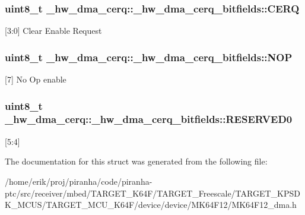 \subsubsection[{\texorpdfstring{C\+E\+RQ}{CERQ}}]{\setlength{\rightskip}{0pt plus 5cm}uint8\+\_\+t \+\_\+hw\+\_\+dma\+\_\+cerq\+::\+\_\+hw\+\_\+dma\+\_\+cerq\+\_\+bitfields\+::\+C\+E\+RQ}\hypertarget{struct__hw__dma__cerq_1_1__hw__dma__cerq__bitfields_a6f0823169a385c91dbbb80a733b55156}{}\label{struct__hw__dma__cerq_1_1__hw__dma__cerq__bitfields_a6f0823169a385c91dbbb80a733b55156}
\mbox{[}3\+:0\mbox{]} Clear Enable Request 
\subsubsection[{\texorpdfstring{N\+OP}{NOP}}]{\setlength{\rightskip}{0pt plus 5cm}uint8\+\_\+t \+\_\+hw\+\_\+dma\+\_\+cerq\+::\+\_\+hw\+\_\+dma\+\_\+cerq\+\_\+bitfields\+::\+N\+OP}\hypertarget{struct__hw__dma__cerq_1_1__hw__dma__cerq__bitfields_a1a3a3088aea9eab35f27b0cc12988d6f}{}\label{struct__hw__dma__cerq_1_1__hw__dma__cerq__bitfields_a1a3a3088aea9eab35f27b0cc12988d6f}
\mbox{[}7\mbox{]} No Op enable 
\subsubsection[{\texorpdfstring{R\+E\+S\+E\+R\+V\+E\+D0}{RESERVED0}}]{\setlength{\rightskip}{0pt plus 5cm}uint8\+\_\+t \+\_\+hw\+\_\+dma\+\_\+cerq\+::\+\_\+hw\+\_\+dma\+\_\+cerq\+\_\+bitfields\+::\+R\+E\+S\+E\+R\+V\+E\+D0}\hypertarget{struct__hw__dma__cerq_1_1__hw__dma__cerq__bitfields_af54136955154647d465ae418721b49de}{}\label{struct__hw__dma__cerq_1_1__hw__dma__cerq__bitfields_af54136955154647d465ae418721b49de}
\mbox{[}5\+:4\mbox{]} 

The documentation for this struct was generated from the following file\+:\begin{DoxyCompactItemize}
\item 
/home/erik/proj/piranha/code/piranha-\/ptc/src/receiver/mbed/\+T\+A\+R\+G\+E\+T\+\_\+\+K64\+F/\+T\+A\+R\+G\+E\+T\+\_\+\+Freescale/\+T\+A\+R\+G\+E\+T\+\_\+\+K\+P\+S\+D\+K\+\_\+\+M\+C\+U\+S/\+T\+A\+R\+G\+E\+T\+\_\+\+M\+C\+U\+\_\+\+K64\+F/device/device/\+M\+K64\+F12/M\+K64\+F12\+\_\+dma.\+h\end{DoxyCompactItemize}
